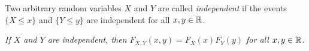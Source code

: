 

\begin{definition}
Two arbitrary random variables $X$ and $Y$ are called \emph{independent} if the events
$\{X\leq x\}$ and $\{Y\leq y\}$ are independent for all $x,y\in\mathbb{R}$. 
\end{definition}

\bit
\it If $X$ and $Y$ are independent, then $F_{X,Y}(x,y) = F_X(x)F_Y(y)$ for all $x,y\in\mathbb{R}$.
\eit


